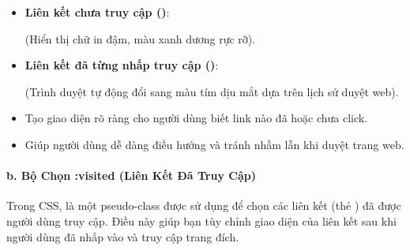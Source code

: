 \begin{browserWindow}
\sffamily\small
\begin{itemize}[leftmargin=1.5em, itemsep=3pt, parsep=0pt]
    \item \textbf{Liên kết chưa truy cập ()}:
    \par\vspace{2pt}
    \quad (Hiển thị chữ in đậm, màu xanh dương rực rỡ).
    \par\vspace{4pt}
    \item \textbf{Liên kết đã từng nhấp truy cập ()}:
    \par\vspace{2pt}
    \quad (Trình duyệt tự động đổi sang màu tím dịu mắt dựa trên lịch sử duyệt web).
\end{itemize}
\end{browserWindow}

\begin{tipBox}
\begin{itemize}[leftmargin=1.5em, itemsep=2pt, parsep=0pt]
    \item Tạo giao diện rõ ràng cho người dùng biết link nào đã hoặc chưa click.
    \item Giúp người dùng dễ dàng điều hướng và tránh nhầm lẫn khi duyệt trang web.
\end{itemize}
\end{tipBox}

\paragraph{b. Bộ Chọn :visited (Liên Kết Đã Truy Cập)}

Trong CSS,  là một pseudo-class được sử dụng để chọn các liên kết (thẻ ) đã được người dùng truy cập. Điều này giúp bạn tùy chỉnh giao diện của liên kết sau khi người dùng đã nhấp vào và truy cập trang đích.

